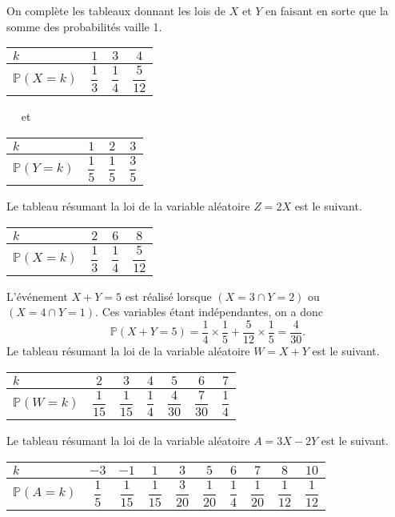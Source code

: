 \documentclass[11pt,fleqn, openany]{book} %
\begin{document}
\begin{solution}On complète les tableaux donnant les lois de $X$ et $Y$ en faisant en sorte que la somme des probabilités vaille 1.

\renewcommand{\arraystretch}{2.2}

\begin{center}
 \begin{tabular}{|l|c|c|c|}
\hline
$k$ & $1$& $3$ & $4$  \\
\hline
$\mathbb{P}(X=k)$ & $\dfrac{1}{3}$ & $\dfrac{1}{4}$ & $\dfrac{5}{12}$ \\
\hline \end{tabular}
$\quad$
et
$\quad$
\begin{tabular}{|l|c|c|c|}
\hline
$k$ & $1$& $2$ & $3$ \\
\hline
$\mathbb{P}(Y=k)$ & $\dfrac{1}{5}$ & $\dfrac{1}{5}$ & $\dfrac{3}{5}$ \\
\hline \end{tabular}
\end{center}

Le tableau résumant la loi de la variable aléatoire $Z=2X$ est le suivant.
\begin{center}
\begin{tabular}{|l|c|c|c|}
\hline
$k$ & $2$& $6$ & $8$  \\
\hline
$\mathbb{P}(X=k)$ & $\dfrac{1}{3}$ & $\dfrac{1}{4}$ & $\dfrac{5}{12}$ \\
\hline \end{tabular}\end{center}

L'événement $X+Y=5$ est réalisé lorsque $(X=3 \cap Y=2)$ ou $(X=4 \cap Y=1)$. Ces variables étant indépendantes, on a donc 
\[\mathbb{P}(X+Y=5) = \dfrac{1}{4} \times \dfrac{1}{5} + \dfrac{5}{12} \times \dfrac{1}{5} = \dfrac{4}{30}.\]
Le tableau résumant la loi de la variable aléatoire $W=X+Y$ est le suivant.

\begin{center}
\begin{tabular}{|l|c|c|c|c|c|c|}
\hline
$k$ & $2$& $3$ & $4$ & $5$ & $6$ & $7$\\
\hline
$\mathbb{P}(W=k)$ & $\dfrac{1}{15}$ & $\dfrac{1}{15}$ & $\dfrac{1}{4}$ & $\dfrac{4}{30}$ & $\dfrac{7}{30}$ & $\dfrac{1}{4}$\\
\hline \end{tabular}\end{center}
Le tableau résumant la loi de la variable aléatoire $A=3X-2Y$ est le suivant.
\begin{center}
\begin{tabular}{|l|c|c|c|c|c|c|c|c|c|}
\hline
$k$ & $-3$& $-1$ & $1$ & $3$ & $5$ & $6$ & $7$ & $8$ & $10$ \\
\hline
$\mathbb{P}(A=k)$ & $\dfrac{1}{5}$ & $\dfrac{1}{15}$ & $\dfrac{1}{15}$ & $\dfrac{3}{20}$ & $\dfrac{1}{20}$ & $\dfrac{1}{4}$ & $\dfrac{1}{20}$ & $\dfrac{1}{12}$ & $\dfrac{1}{12}$\\
\hline \end{tabular}\end{center}
\end{solution}
\end{document}
